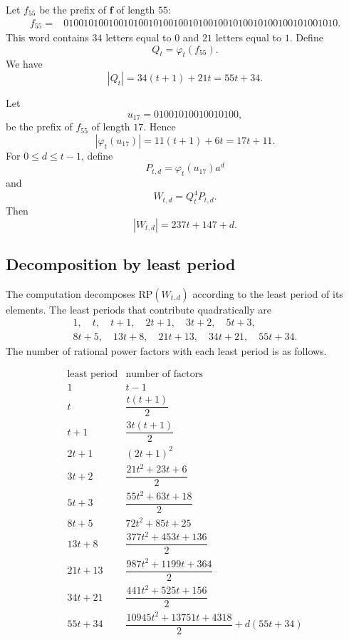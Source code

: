 \documentclass[runningheads,envcountsame,a4paper]{llncs}
\newcommand{\rp}{\mathrm{RP}}
\begin{document}
Let $f_{55}$ be the prefix of $\mathbf f$ of length $55$:
\[
\begin{aligned}
    f_{55}={}&
    0100101001001010010100100101001001010010100100101001010.
\end{aligned}
\]
This word contains $34$ letters equal to $0$ and $21$ letters equal to
$1$. Define
\[
    Q_t=\varphi_t(f_{55}).
\]
We have
\[
    |Q_t|=34(t+1)+21t=55t+34.
\]

Let
\[
    u_{17}=01001010010010100,
\]
be the prefix of $f_{55}$ of length $17$. Hence
\[
    |\varphi_t(u_{17})|=11(t+1)+6t=17t+11.
\]
For $0\le d\le t-1$, define
\[
    P_{t,d}=\varphi_t(u_{17})a^d
\]
and
\[
    W_{t,d}=Q_t^4P_{t,d}.
\]
Then
\[
|W_{t,d}|=237t+147+d.
\]

\subsection{Decomposition by least period}

The computation decomposes $\rp(W_{t,d})$ according to the least period
of its elements. The least periods that contribute quadratically are
\[
\begin{gathered}
    1,\quad t,\quad t+1,\quad 2t+1,\quad 3t+2,\quad 5t+3,\\
    8t+5,\quad 13t+8,\quad 21t+13,\quad 34t+21,\quad 55t+34.
\end{gathered}
\]
The number of rational power factors with each least period is as
follows.

\[
\begin{array}{c|c}
\text{least period} & \text{number of factors}\\
\hline
1
    & t-1\\[1mm]

t
    & \dfrac{t(t+1)}{2}\\[2mm]

t+1
    & \dfrac{3t(t+1)}{2}\\[2mm]

2t+1
    & (2t+1)^2\\[1mm]

3t+2
    & \dfrac{21t^2+23t+6}{2}\\[2mm]

5t+3
    & \dfrac{55t^2+63t+18}{2}\\[2mm]

8t+5
    & 72t^2+85t+25\\[1mm]

13t+8
    & \dfrac{377t^2+453t+136}{2}\\[2mm]

21t+13
    & \dfrac{987t^2+1199t+364}{2}\\[2mm]

34t+21
    & \dfrac{441t^2+525t+156}{2}\\[2mm]

55t+34
    & \dfrac{10945t^2+13751t+4318}{2}+d(55t+34)
\end{array}
\]
\end{document}
